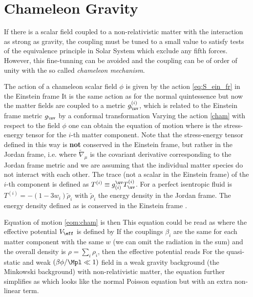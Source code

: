 \section{Chameleon Gravity}
\label{sec_cham}
If there is a scalar field coupled to a non-relativistic matter with the interaction as strong as gravity, the coupling must be tuned to a small value to satisfy tests of the equivalence principle in Solar System which exclude any fifth forces. However, this fine-tunning can be avoided and the coupling can be of order of unity with the so called \textit{chameleon mechanism}.

The action of a chameleon scalar field $\phi$ is given by the action \eqref{eq:S_ein_fr} in the Einstein frame
It is the same action as for the normal quintessence but now the matter fields are coupled to a metric $g_\uv^{(i)}$, which is related to the Einstein frame metric $g_\uv$ by a conformal transformation
Varying the action \eqref{cham} with respect to the field $\phi$ one can obtain the equation of motion
where
is the stress-energy tensor for the $i$-th matter component. Note that the stress-energy tensor defined in this way is \textbf{not} conserved in the Einstein frame, but rather in the Jordan frame, i.e.
where $\tilde{\nabla}_\mu$ is the covariant derivative corresponding to the Jordan frame metric and we are assuming that the individual matter species do not interact with each other. The trace (not a scalar in the Einstein frame) of the $i$-th component is defined as $T^{(i)}\equiv g^\uv_{(i)}T^{(i)}_\uv$. For a perfect isentropic fluid is $T^{(i)}=-(1-3w_i)\tilde{\rho}_i$ with $\tilde{\rho}_i$ the energy density in the Jordan frame. The energy density defined as
is conserved in the Einstein frame \parencite{Waterhouse:2006wv}.

Equation of motion \eqref{eom:cham} is then
This equation could be read as
where the effective potential $V_{\eff}$ is defined by
If the couplings $\beta_i$ are the same for each matter component with the same $w$ (we can omit the radiation in the sum) and the overall density is $\rho=\sum_i\rho_i$, then the effective potential reads
For the quasi-static and weak $(\beta\phi/\Mpl\ll1)$ field in a weak gravity background (the Minkowski background) with non-relativistic matter, the equation further simplifies as
which looks like the normal Poisson equation but with an extra non-linear term.
